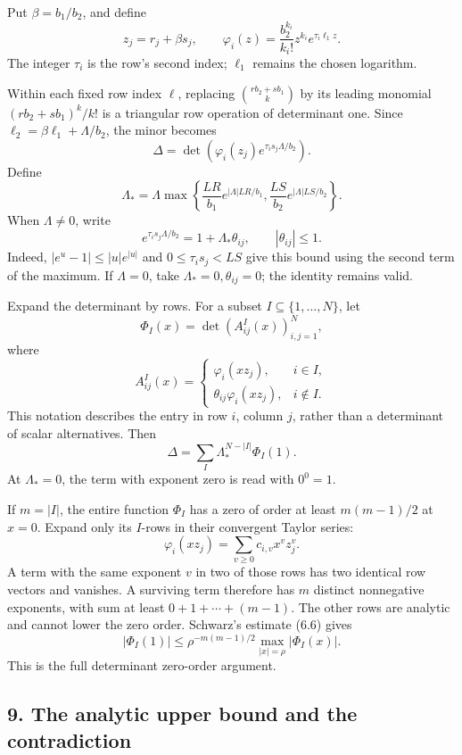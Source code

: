 \documentclass[
  11pt,
  a4paper,
]{article}
\begin{document}
Put \(\beta=b_1/b_2\), and define \[
z_j=r_j+\beta s_j,\qquad
\varphi_i(z)=\frac{b_2^{k_i}}{k_i!}z^{k_i}e^{\tau_i\ell_1z}.
\] The integer \(\tau_i\) is the row's second index; \(\ell_1\) remains
the chosen logarithm.

Within each fixed row index \(\ell\), replacing \(\binom{rb_2+sb_1}{k}\)
by its leading monomial \((rb_2+sb_1)^k/k!\) is a triangular row
operation of determinant one. Since \(\ell_2=\beta\ell_1+\Lambda/b_2\),
the minor becomes \[
\Delta=\det\left(\varphi_i(z_j)e^{\tau_i s_j\Lambda/b_2}\right).
\] Define \[
\Lambda_*=\Lambda\max\left\{
\frac{LR}{b_1}e^{|\Lambda|LR/b_1},
\frac{LS}{b_2}e^{|\Lambda|LS/b_2}\right\}.
\] When \(\Lambda\ne0\), write \[
e^{\tau_i s_j\Lambda/b_2}=1+\Lambda_*\theta_{ij},
\qquad |\theta_{ij}|\le1. \tag{6.17}
\] Indeed, \(|e^u-1|\le |u|e^{|u|}\) and \(0\le\tau_i s_j<LS\) give this
bound using the second term of the maximum. If \(\Lambda=0\), take
\(\Lambda_*=0,\theta_{ij}=0\); the identity remains valid.

Expand the determinant by rows. For a subset
\(I\subseteq\{1,\ldots,N\}\), let \[
\Phi_I(x)=\det(A^I_{ij}(x))_{i,j=1}^N,
\] where \[
A^I_{ij}(x)=
\begin{cases}
\varphi_i(xz_j),&i\in I,\\
\theta_{ij}\varphi_i(xz_j),&i\notin I.
\end{cases}
\] This notation describes the entry in row \(i\), column \(j\), rather
than a determinant of scalar alternatives. Then \[
\Delta=\sum_I\Lambda_*^{N-|I|}\Phi_I(1). \tag{6.18}
\] At \(\Lambda_*=0\), the term with exponent zero is read with
\(0^0=1\).

If \(m=|I|\), the entire function \(\Phi_I\) has a zero of order at
least \(m(m-1)/2\) at \(x=0\). Expand only its \(I\)-rows in their
convergent Taylor series: \[
\varphi_i(xz_j)=\sum_{v\ge0}c_{i,v}x^v z_j^v.
\] A term with the same exponent \(v\) in two of those rows has two
identical row vectors and vanishes. A surviving term therefore has \(m\)
distinct nonnegative exponents, with sum at least \(0+1+\cdots+(m-1)\).
The other rows are analytic and cannot lower the zero order. Schwarz's
estimate (6.6) gives \[
|\Phi_I(1)|\le\rho^{-m(m-1)/2}\max_{|x|=\rho}|\Phi_I(x)|. \tag{6.19}
\] This is the full determinant zero-order argument.

\subsection{9. The analytic upper bound and the
contradiction}\label{the-analytic-upper-bound-and-the-contradiction}
\end{document}
